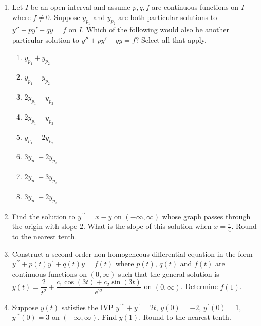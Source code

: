 \documentclass{ximera}
\begin{document}
\begin{enumerate}[label=(\arabic*)]


\item Let $I$ be an open interval and assume $p,q,f$ are continuous functions on $I$ where $f\neq 0$.  Suppose $y_{p_1}$ and $y_{p_2}$ are both particular solutions to $y''+py'+qy=f$ on $I$.  Which of the following would also be another particular solution to $y''+py'+qy=f$?  Select all that apply.

\begin{enumerate}[label=(\alph*)]
\item $y_{p_1}+y_{p_2}$
\item $y_{p_1}-y_{p_2}$
\item $2y_{p_1}+y_{p_2}$
\item $2y_{p_1}-y_{p_2}$   %
\item $y_{p_1}-2y_{p_2}$
\item $3y_{p_1}-2y_{p_2}$  %
\item $2y_{p_1}-3y_{p_2}$
\item $3y_{p_1}+2y_{p_2}$ 
\end{enumerate}


\newpage


\item Find the solution to $y^{\,\prime\prime}=x-y$ on $(-\infty,\infty)$ whose graph passes through the origin with slope $2$.  What is the slope of this solution when $x=\displaystyle \frac{\pi}{4}$.  Round to the nearest tenth.




\item Construct a second order non-homogeneous differential equation in the form $y^{\,\prime\prime}+p(t)y^{\,\prime}+q(t)y=f(t)$ where $p(t)$, $q(t)$ and $f(t)$ are continuous functions on $(0,\infty)$ such that the general solution is\\ $y(t)=\dfrac{2}{t^2}+\dfrac{c_1\cos{(3t)}+c_2 \sin{(3t)}}{e^{2t}}$ on $(0,\infty)$.  Determine $f(1)$.  


\item Suppose $y(t)$ satisfies the IVP $y^{\,\prime\prime\prime}+y^{\,\prime}=2t$, $y(0)=-2$, $y^{\,\prime}(0)=1$, $y^{\,\prime\prime}(0)=3$  on $(-\infty,\infty)$.  Find $y(1)$.  Round to the nearest tenth. 




\end{enumerate}
\end{document}
